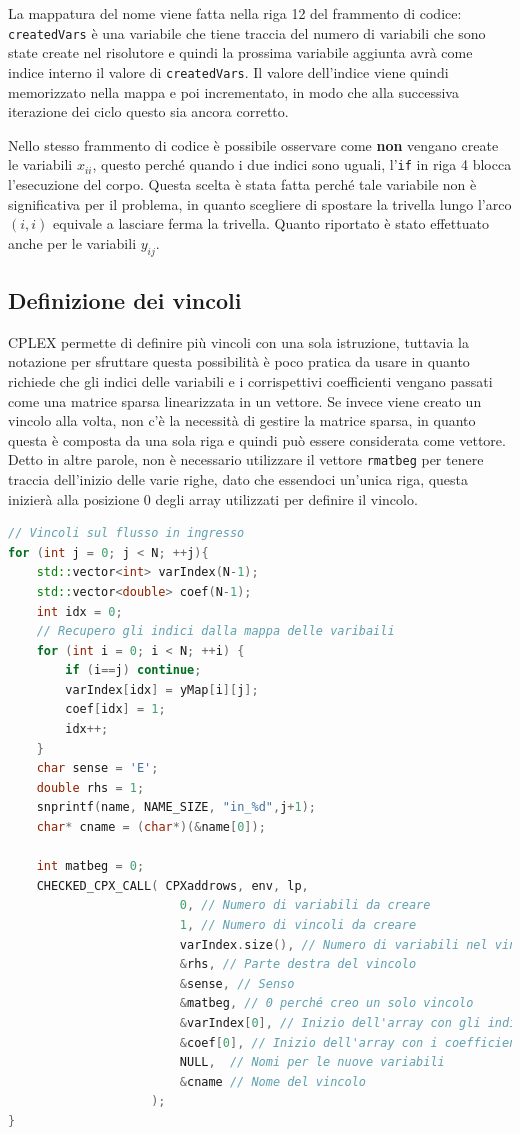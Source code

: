 \noindent La mappatura del nome viene fatta nella riga 12 del frammento di codice: \texttt{createdVars} è una variabile che tiene traccia del numero di variabili che sono state create nel risolutore e quindi la prossima variabile aggiunta avrà come indice interno il valore di \texttt{createdVars}. Il valore dell'indice viene quindi memorizzato nella mappa e poi incrementato, in modo che alla successiva iterazione dei ciclo questo sia ancora corretto.

Nello stesso frammento di codice è possibile osservare come \textbf{non} vengano create le variabili $x_{ii}$, questo perché quando i due indici sono uguali, l'\texttt{if} in riga 4 blocca l'esecuzione del corpo. 
Questa scelta è stata fatta perché tale variabile non è significativa per il problema, in quanto scegliere di spostare la trivella lungo l'arco $(i,i)$ equivale a lasciare ferma la trivella.
Quanto riportato è stato effettuato anche per le variabili $y_{ij}$.

\subsection{Definizione dei vincoli}

CPLEX permette di definire più vincoli con una sola istruzione, tuttavia la notazione per sfruttare questa possibilità è poco pratica da usare in quanto richiede che gli indici delle variabili e i corrispettivi coefficienti vengano passati come una matrice sparsa linearizzata in un vettore.
Se invece viene creato un vincolo alla volta, non c'è la necessità di gestire la matrice sparsa, in quanto questa è composta da una sola riga e quindi può essere considerata come vettore. 
Detto in altre parole, non è necessario utilizzare il vettore \texttt{rmatbeg} per tenere traccia dell'inizio delle varie righe, dato che essendoci un'unica riga, questa inizierà alla posizione 0 degli array utilizzati per definire il vincolo.

\begin{lstlisting}[language=C++, caption=Esempio di creazione di una serie di vincoli]
// Vincoli sul flusso in ingresso
for (int j = 0; j < N; ++j){
	std::vector<int> varIndex(N-1);
	std::vector<double> coef(N-1);
	int idx = 0;
	// Recupero gli indici dalla mappa delle varibaili
	for (int i = 0; i < N; ++i) {
		if (i==j) continue;
		varIndex[idx] = yMap[i][j];
		coef[idx] = 1;
		idx++;
	}
	char sense = 'E';
	double rhs = 1;
	snprintf(name, NAME_SIZE, "in_%d",j+1);
	char* cname = (char*)(&name[0]);

	int matbeg = 0;
	CHECKED_CPX_CALL( CPXaddrows, env, lp, 
						0, // Numero di variabili da creare
						1, // Numero di vincoli da creare
						varIndex.size(), // Numero di variabili nel vincolo con coeff != 0
						&rhs, // Parte destra del vincolo
						&sense, // Senso
						&matbeg, // 0 perché creo un solo vincolo
						&varIndex[0], // Inizio dell'array con gli indici delle variabili
						&coef[0], // Inizio dell'array con i coefficienti delle variabili
						NULL,  // Nomi per le nuove variabili
						&cname // Nome del vincolo
					);
}
\end{lstlisting}


